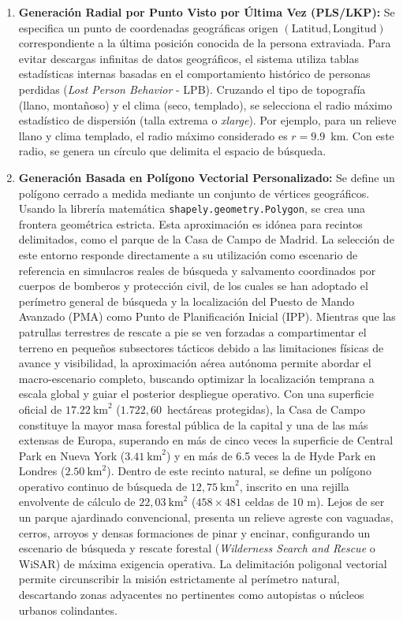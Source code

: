 \begin{enumerate}
    \item \textbf{Generación Radial por Punto Visto por Última Vez (PLS/LKP):} Se especifica un punto de coordenadas geográficas origen $(\text{Latitud}, \text{Longitud})$ correspondiente a la última posición conocida de la persona extraviada. Para evitar descargas infinitas de datos geográficos, el sistema utiliza tablas estadísticas internas basadas en el comportamiento histórico de personas perdidas (\textit{Lost Person Behavior} - LPB). Cruzando el tipo de topografía (llano, montañoso) y el clima (seco, templado), se selecciona el radio máximo estadístico de dispersión (talla extrema o \textit{xlarge}). Por ejemplo, para un relieve llano y clima templado, el radio máximo considerado es $r = 9.9$~km. Con este radio, se genera un círculo que delimita el espacio de búsqueda.
    \item \textbf{Generación Basada en Polígono Vectorial Personalizado:} Se define un polígono cerrado a medida mediante un conjunto de vértices geográficos. Usando la librería matemática \texttt{shapely.geometry.Polygon}, se crea una frontera geométrica estricta. Esta aproximación es idónea para recintos delimitados, como el parque de la Casa de Campo de Madrid. La selección de este entorno responde directamente a su utilización como escenario de referencia en simulacros reales de búsqueda y salvamento coordinados por cuerpos de bomberos y protección civil, de los cuales se han adoptado el perímetro general de búsqueda y la localización del Puesto de Mando Avanzado (PMA) como Punto de Planificación Inicial (IPP). Mientras que las patrullas terrestres de rescate a pie se ven forzadas a compartimentar el terreno en pequeños subsectores tácticos debido a las limitaciones físicas de avance y visibilidad, la aproximación aérea autónoma permite abordar el macro-escenario completo, buscando optimizar la localización temprana a escala global y guiar el posterior despliegue operativo. Con una superficie oficial de $17.22~\text{km}^2$ ($1.722{,}60$~hectáreas protegidas), la Casa de Campo constituye la mayor masa forestal pública de la capital y una de las más extensas de Europa, superando en más de cinco veces la superficie de Central Park en Nueva York ($3.41~\text{km}^2$) y en más de 6.5 veces la de Hyde Park en Londres ($2.50~\text{km}^2$). Dentro de este recinto natural, se define un polígono operativo continuo de búsqueda de $12{,}75~\text{km}^2$, inscrito en una rejilla envolvente de cálculo de $22{,}03~\text{km}^2$ ($458 \times 481$ celdas de $10\text{ m}$). Lejos de ser un parque ajardinado convencional, presenta un relieve agreste con vaguadas, cerros, arroyos y densas formaciones de pinar y encinar, configurando un escenario de búsqueda y rescate forestal (\textit{Wilderness Search and Rescue} o WiSAR) de máxima exigencia operativa. La delimitación poligonal vectorial permite circunscribir la misión estrictamente al perímetro natural, descartando zonas adyacentes no pertinentes como autopistas o núcleos urbanos colindantes.
\end{enumerate}

